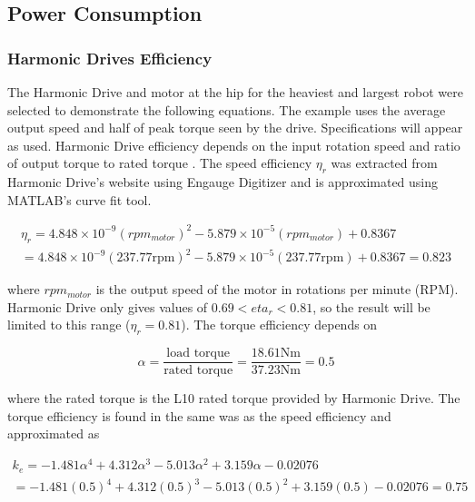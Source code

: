 \subsection{Power Consumption} \label{subsec:power_consumption}

\subsubsection{Harmonic Drives Efficiency} \label{subsubsec:HD_efficiency}

The Harmonic Drive and motor at the hip for the heaviest and largest robot were selected to demonstrate the following equations.
The example uses the average output speed and half of peak torque seen by the drive.
Specifications will appear as used.
Harmonic Drive efficiency depends on the input rotation speed and ratio of output torque to rated torque \cite{harmonic_drive_csd-2a_2019}.
The speed efficiency $\eta_r$ was extracted from Harmonic Drive's website using Engauge Digitizer and is approximated using MATLAB's curve fit tool.

\begin{equation}
    \begin{split}
        \eta_r = 4.848\times10^{-9} (rpm_{motor})^2 -5.879\times10^{-5} (rpm_{motor}) + 0.8367
        \\
        = 4.848\times10^{-9} (237.77\text{rpm})^2 -5.879\times10^{-5} (237.77\text{rpm}) + 0.8367 = 0.823
    \end{split}{}
\end{equation}

where $rpm_{motor}$ is the output speed of the motor in rotations per minute (RPM).
Harmonic Drive only gives values of $0.69 < eta_r < 0.81$, so the result will be limited to this range ($\eta_r=0.81$).
The torque efficiency depends on

\begin{equation}
    \alpha = \frac{\text{load torque}}{\text{rated torque}} = \frac{18.61\text{Nm}}{37.23\text{Nm}} = 0.5
\end{equation}{}

where the rated torque is the L10 rated torque provided by Harmonic Drive.
The torque efficiency is found in the same was as the speed efficiency and approximated as

\begin{equation}
    \begin{split}
        k_e = -1.481\alpha^4 + 4.312\alpha^3 - 5.013\alpha^2 + 3.159\alpha - 0.02076
        \\
        = -1.481(0.5)^4 + 4.312(0.5)^3 - 5.013(0.5)^2 + 3.159(0.5) - 0.02076 = 0.75
    \end{split}
\end{equation}{}

